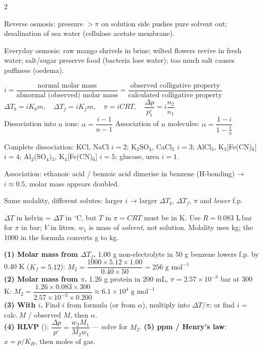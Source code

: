 \documentclass[9pt,a4paper]{extarticle}
\begin{document}
\begin{multicols}{2}
\begin{fl}
\item Reverse osmosis: pressure $>\pi$ on solution side pushes pure solvent out; desalination of sea water (cellulose acetate membrane).
\item Everyday osmosis: raw mango shrivels in brine; wilted flowers revive in fresh water; salt/sugar preserve food (bacteria lose water); too much salt causes puffiness (oedema).
\end{fl}
\begin{kbox}
$i=\dfrac{\text{normal molar mass}}{\text{abnormal (observed) molar mass}}=\dfrac{\text{observed colligative property}}{\text{calculated colligative property}}$\\[2pt]
$\Delta T_b=iK_bm,\quad \Delta T_f=iK_fm,\quad \pi=iCRT,\quad \dfrac{\Delta p}{p_1^\circ}=i\dfrac{n_2}{n_1}$\\[2pt]
Dissociation into $n$ ions: $\alpha=\dfrac{i-1}{n-1}$ \qquad Association of $n$ molecules: $\alpha=\dfrac{1-i}{1-\frac1n}$
\end{kbox}
\begin{fl}
\item Complete dissociation: KCl, NaCl $i=2$; K$_2$SO$_4$, CaCl$_2$ $i=3$; AlCl$_3$, K$_3$[Fe(CN)$_6$] $i=4$; Al$_2$(SO$_4$)$_3$, K$_4$[Fe(CN)$_6$] $i=5$; glucose, urea $i=1$.
\item Association: ethanoic acid / benzoic acid dimerise in benzene (H-bonding) → $i\approx0.5$, molar mass appears doubled.
\item Same molality, different solutes: larger $i$ → larger $\Delta T_b$, $\Delta T_f$, $\pi$ and \emph{lower} f.p.
\end{fl}
\begin{tip}\Tip $\Delta T$ in kelvin = $\Delta T$ in $^\circ$C, but $T$ in $\pi=CRT$ must be in K. Use $R=0.083$ L\,bar for $\pi$ in bar; $V$ in litres. $w_1$ is mass of \emph{solvent}, not solution. Molality uses kg; the 1000 in the formula converts g to kg.\end{tip}
\begin{numbox}\Num\par\scriptsize
\textbf{(1) Molar mass from $\Delta T_f$.} 1.00 g non-electrolyte in 50 g benzene lowers f.p. by 0.40 K ($K_f=5.12$): $M_2=\dfrac{1000\times5.12\times1.00}{0.40\times50}=\boxed{256\text{ g mol}^{-1}}$\\[1pt]
\textbf{(2) Molar mass from $\pi$.} 1.26 g protein in 200 mL, $\pi=2.57\times10^{-3}$ bar at 300 K: $M_2=\dfrac{1.26\times0.083\times300}{2.57\times10^{-3}\times0.200}\approx\boxed{6.1\times10^4\text{ g mol}^{-1}}$\\[1pt]
\textbf{(3) With $i$.} Find $i$ from formula (or from $\alpha$), multiply into $\Delta T$/$\pi$; or find $i$ = calc.\,$M$ / observed $M$, then $\alpha$.\\[1pt]
\textbf{(4) RLVP} (\SQP): $\dfrac{\Delta p}{p^\circ}=\dfrac{w_2M_1}{M_2w_1}$ — solve for $M_2$. \textbf{(5) ppm / Henry's law}: $x=p/K_H$, then moles of gas.
\end{numbox}


\end{multicols}
\end{document}
